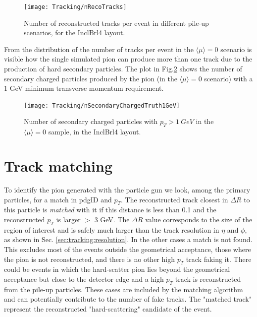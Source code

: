 \documentclass[a4paper,twoside,12pt]{book}
\begin{document}
\begin{figure}
\centering
\texttt{[image: Tracking/nRecoTracks]}
\caption{Number of reconstructed tracks per event in different pile-up scenarios, for the InclBrl4 layout.}
\label{fig:tracking:nRecoTracks}
\end{figure}

From the distribution of the number of tracks per event in the $\langle\mu\rangle = 0$ scenario is visible
how the single simulated pion can produce more than one track due to the production of hard secondary particles. The plot in Fig.\ref{fig:tracking:nSecondaryChargedTruth1GeV} shows the number of secondary charged particles produced by the pion (in the $\langle\mu\rangle = 0$ scenario)
with a 1 GeV minimum transverse momentum requirement. \\

\begin{figure}
\centering
\texttt{[image: Tracking/nSecondaryChargedTruth1GeV]}
\caption{Number of secondary charged particles with $p_T > 1\ GeV$ in the $\langle\mu\rangle = 0$ sample, in the InclBrl4 layout.}
\label{fig:tracking:nSecondaryChargedTruth1GeV}
\end{figure}

\section{Track matching}\label{subsec:tracking:matching}
To identify the pion generated with the particle gun we look, among the primary particles, for a match in pdgID and $p_{T}$. The
reconstructed track closest in $\Delta R$ to this particle is \textit{matched} with it if this distance is less than 0.1 and the reconstructed $p_{T}$ is 
larger $>$ 3 GeV. The $\Delta R$ value corresponds to the size of the 
region of interest and is safely much larger than the track resolution in $\eta$ and $\phi$, as shown in Sec. \ref{sec:tracking:resolution}. In the other cases a match
is not found. This excludes most of the events outside the geometrical acceptance, those where the pion is not reconstructed, and there is no other 
high $p_{T}$ track faking it. There could be events in which the hard-scatter pion lies beyond the geometrical acceptance but close to the detector edge 
and a high $p_{T}$ track is reconstructed from the pile-up particles. These cases are included by the matching algorithm and can potentially contribute
to the number of fake tracks. The "matched track"
represent the reconstructed "hard-scattering" candidate of the event.  
\end{document}
